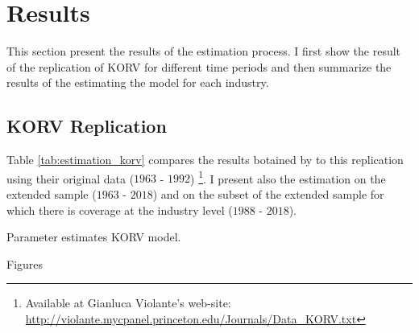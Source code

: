 \documentclass[12pt]{article}
\begin{document}
\section{Results}\label{sec:results}
This section present the results of the estimation process. I first show the result of the replication of KORV for different time periods and  then summarize the results of the estimating the model for each industry.
\subsection{KORV Replication}\label{sec:results_original}
Table \ref{tab:estimation_korv} compares the results botained by \citep{krusell2000capital} to this replication using their 
original data ($1963$ - $1992$) \footnote{Available at Gianluca Violante's web-site: \url{http://violante.mycpanel.princeton.edu/Journals/Data_KORV.txt}}. I present also the estimation on the extended sample ($1963$ - $2018$) and on the subset of the extended sample for which there is coverage at the industry level  ($1988$ - $2018$). 

\begin{table}[h]
\begin{center}
  
  \caption{\label{tab:estimation_korv} Parameter estimates KORV model.}
\end{center}
\end{table}
Figures 


\end{document}
